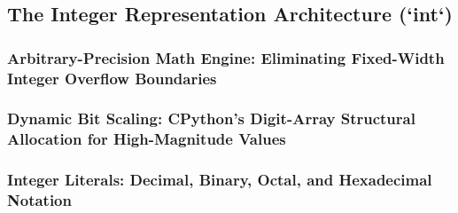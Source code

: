 \subsection{The Integer Representation Architecture (`int`)}
\subsubsection{Arbitrary-Precision Math Engine: Eliminating Fixed-Width Integer Overflow Boundaries}
\subsubsection{Dynamic Bit Scaling: CPython's Digit-Array Structural Allocation for High-Magnitude Values}
\subsubsection{Integer Literals: Decimal, Binary, Octal, and Hexadecimal Notation}
